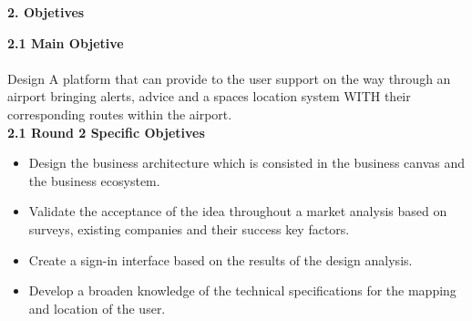 \documentclass[]{article}
\begin{document}
\Large{
\textbf{2. Objetives}\\
}

\Large{
\textbf{2.1 Main Objetive}\\
}\\
[0.1cm]

Design A platform that can provide to the user support on the way through an airport bringing alerts, advice and a spaces location system WITH their corresponding routes within the airport.\\

\Large{
\textbf{2.1 Round 2 Specific Objetives}\\
}
\begin{itemize}
	\item Design the business architecture which is consisted in the business canvas and the business ecosystem.
	\item Validate the acceptance of the idea throughout a market analysis based on surveys, existing companies and 		their success key factors.
	\item Create a sign-in interface based on the results of the design analysis. 
	\item Develop a broaden knowledge of the technical specifications for the mapping and location of the user. 
	
\end{itemize}
\end{document}
